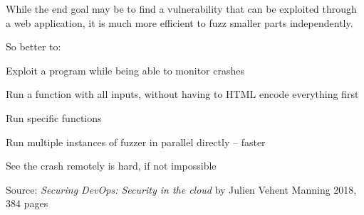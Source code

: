 \documentclass[Screen16to9,17pt]{foils}
\begin{document}
While the end goal may be to find a vulnerability that can be exploited through a web application, it is much more efficient to fuzz smaller parts independently.

So better to:
\begin{list2}
\item Exploit a program while being able to monitor crashes
\item Run a function with all inputs, without having to HTML encode everything first
\item Run specific functions
\item Run multiple instances of fuzzer in parallel directly -- faster
\end{list2}

See the crash remotely is hard, if not impossible



Source:
\emph{Securing DevOps: Security in the cloud} by Julien Vehent
Manning 2018, 384 pages

\slidenext{}
\end{document}
